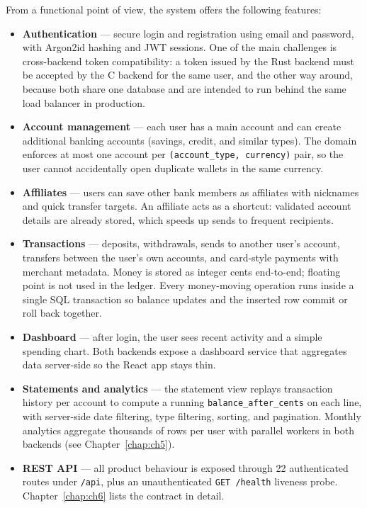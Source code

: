 \par From a functional point of view, the system offers the following features:
\begin{itemize}
  \item \textbf{Authentication} --- secure login and registration using email and 
  password, with Argon2id hashing and JWT sessions. One of the 
  main challenges is cross-backend token compatibility: a token issued by the 
  Rust backend must be accepted by the C backend for the same user, and the 
  other way around, because both share one database and are intended to run 
  behind the same load balancer in production.
  \item \textbf{Account management} --- each user has a main account and can 
  create additional banking accounts (savings, credit, and similar types). 
  The domain enforces at most one account per \texttt{(account\_type, currency)} 
  pair, so the user cannot accidentally open duplicate wallets in the same currency.
  \item \textbf{Affiliates} --- users can save other bank members as affiliates 
  with nicknames and quick transfer targets. An affiliate acts as a shortcut: 
  validated account details are already stored, which speeds up sends to frequent 
  recipients.
  \item \textbf{Transactions} --- deposits, withdrawals, sends to another user's 
  account, transfers between the user's own accounts, and card-style payments 
  with merchant metadata. Money is stored as integer cents end-to-end; floating 
  point is not used in the ledger. Every money-moving operation runs inside a 
  single SQL transaction so balance updates and the inserted row commit or roll 
  back together.
  \item \textbf{Dashboard} --- after login, the user sees recent activity and a 
  simple spending chart. Both backends expose a dashboard service that aggregates 
  data server-side so the React app stays thin.
  \item \textbf{Statements and analytics} --- the statement view replays transaction 
  history per account to compute a running \texttt{balance\_after\_cents} on each 
  line, with server-side date filtering, type filtering, sorting, and pagination. 
  Monthly analytics aggregate thousands of rows per user with parallel workers in 
  both backends (see Chapter~\ref{chap:ch5}).
  \item \textbf{REST API} --- all product behaviour is exposed through 22 authenticated 
  routes under \texttt{/api}, plus an unauthenticated \texttt{GET /health} liveness 
  probe. Chapter~\ref{chap:ch6} lists the contract in detail.
\end{itemize}

